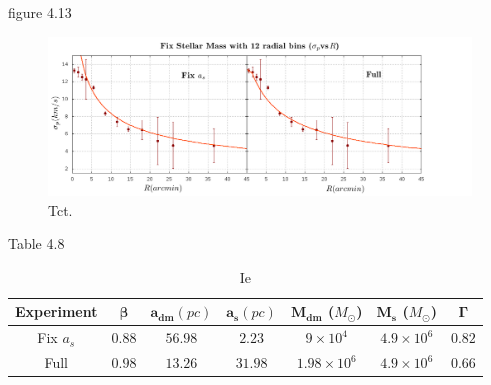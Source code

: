 figure 4.13

\begin{figure}[H]
\centering
\includegraphics[width=15cm]{images/Starlight_25_12.png}
\caption[En]{Tct.}
\end{figure}

Table 4.8

\begin{table}[H]
\begin{center}
\begin{tabular}{| c| c| c| c| c| c| c|}
    \hline
    \textbf{Experiment} & $\mathbf{\beta}$ & $\mathbf{a_{dm}} (pc)$ & $\mathbf{a_{s}} (pc)$ & $\mathbf{M_{dm}}$ ($M_{\odot}$) & $\mathbf{M_{s}}$ ($M_{\odot}$) & $\mathbf{\Gamma}$\\ \hline
	Fix $a_s$ &	$0.88$ &	$56.98$ &	$2.23$ &	$9 \times 10^{4}$ &	$4.9 \times 10 ^{6}$ &	$0.82$\\ \hline
	Full &	$0.98$ &	$13.26$ &	$31.98$ &	$1.98 \times 10^{6}$ &	$4.9 \times 10^{6}$ &	$0.66$\\ \hline
  \end{tabular} 
\caption[It]{Ie}
\end{center}
  
\end{table}
